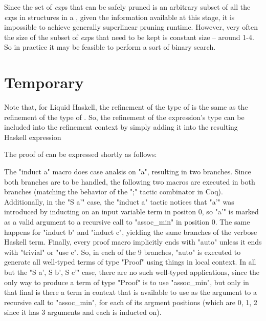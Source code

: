 Since the set of \textit{exp}s that can be safely pruned is an arbitrary subset of all the \textit{exp}s in  structures in a \LangBTerm, given the information available at this stage, it is impossible to achieve generally superlinear pruning runtime. 
However, very often the size of the subset of \textit{exp}s that need to be kept is constant size -- around 1-4.
So in practice it may be feasible to perform a sort of binary search.

\section*{Temporary}

Note that, for Liquid Haskell, the refinement of the type of  is the same as the refinement of the type of .
So, the refinement of the expression's type can be included into the refinement context by simply adding it into the resulting Haskell expression

The proof of  can be expressed shortly as follows:
  
 The "induct a" macro does case analsis on "a", resulting in two branches. Since both branches are to be handled, the following two macros are executed in both branches (matching the behavior of the ";" tactic combinator in Coq).
 Additionally, in the "S a'" case, the "induct a" tactic notices that "a'" was introduced by inducting on an input variable term in positon 0, so "a'" is marked as a valid argument to a recursive call to "assoc\_min" in position 0.
 The same happens for "induct b" and "induct c", yielding the same branches of the verbose Haskell term.
 Finally, every proof macro implicitly ends with "auto" unless it ends with "trivial" or "use e".
 So, in each of the 9 branches, "auto" is executed to generate all well-typed terms of type "Proof" using things in local context.
 In all but the "S a', S b', S c'" case, there are no such well-typed applications, since the only way to produce a term of type "Proof" is to use "assoc\_min", but only in that final is there a term in context that is available to use as the argument to a recursive call to "assoc\_min", for each of its argment positions (which are 0, 1, 2 since it has 3 arguments and each is inducted on).
  